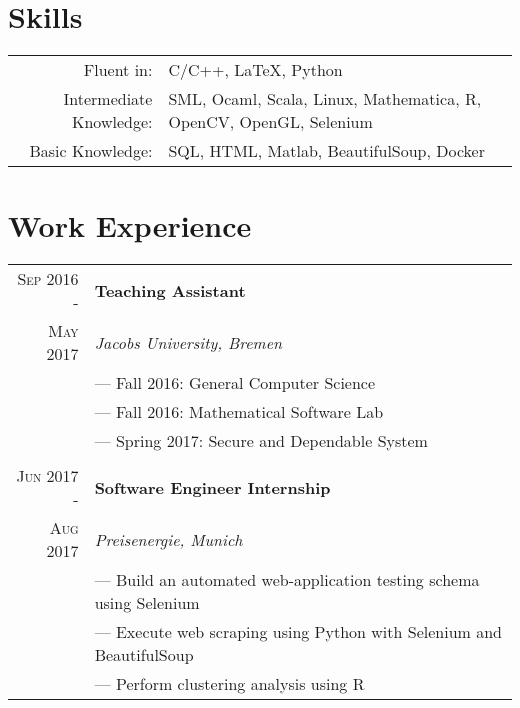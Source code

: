 \documentclass[a4paper,10pt]{article}
\begin{document}
	
	\section{Skills}
	\begin{tabular}{rl}
		Fluent in: & C/C++, LaTeX, Python\\
		Intermediate Knowledge:& SML, Ocaml, Scala, Linux, Mathematica, R, OpenCV, OpenGL, Selenium\\
		Basic Knowledge:& SQL, HTML, Matlab, BeautifulSoup, Docker\\
	\end{tabular}
	
	
	
	\section{Work Experience}
	\begin{tabular}{r|l}
		\textsc{Sep 2016 - } & \textbf{Teaching Assistant} \\\textsc{May 2017}&\emph{Jacobs University, Bremen}
		\\& --- Fall 2016: General Computer Science
		\\& --- Fall 2016: Mathematical Software Lab
		\\& --- Spring 2017: Secure and Dependable System
		\\ \multicolumn{1}{c}{} \\
		\textsc{Jun 2017 - } & \textbf{Software Engineer Internship} \\\textsc{Aug 2017}&\emph{Preisenergie, Munich}
		\\& --- Build an automated web-application testing schema using Selenium
		\\& --- Execute web scraping using Python with Selenium and BeautifulSoup
		\\& --- Perform clustering analysis using R
	\end{tabular}
	
\end{document}
